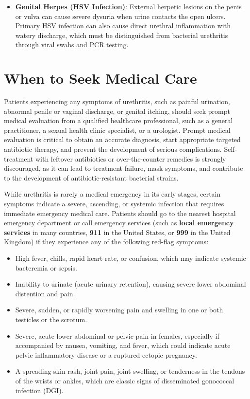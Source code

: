 \begin{itemize}
    \item \textbf{Genital Herpes (HSV Infection)}: External herpetic lesions on the penis or vulva can cause severe dysuria when urine contacts the open ulcers. Primary HSV infection can also cause direct urethral inflammation with watery discharge, which must be distinguished from bacterial urethritis through viral swabs and PCR testing.
\end{itemize}

\section*{When to Seek Medical Care}
Patients experiencing any symptoms of urethritis, such as painful urination, abnormal penile or vaginal discharge, or genital itching, should seek prompt medical evaluation from a qualified healthcare professional, such as a general practitioner, a sexual health clinic specialist, or a urologist. Prompt medical evaluation is critical to obtain an accurate diagnosis, start appropriate targeted antibiotic therapy, and prevent the development of serious complications. Self-treatment with leftover antibiotics or over-the-counter remedies is strongly discouraged, as it can lead to treatment failure, mask symptoms, and contribute to the development of antibiotic-resistant bacterial strains.

While urethritis is rarely a medical emergency in its early stages, certain symptoms indicate a severe, ascending, or systemic infection that requires immediate emergency medical care. Patients should go to the nearest hospital emergency department or call emergency services (such as \textbf{local emergency services} in many countries, \textbf{911} in the United States, or \textbf{999} in the United Kingdom) if they experience any of the following red-flag symptoms:
\begin{itemize}
    \item High fever, chills, rapid heart rate, or confusion, which may indicate systemic bacteremia or sepsis.

    \item Inability to urinate (acute urinary retention), causing severe lower abdominal distention and pain.

    \item Severe, sudden, or rapidly worsening pain and swelling in one or both testicles or the scrotum.

    \item Severe, acute lower abdominal or pelvic pain in females, especially if accompanied by nausea, vomiting, and fever, which could indicate acute pelvic inflammatory disease or a ruptured ectopic pregnancy.

    \item A spreading skin rash, joint pain, joint swelling, or tenderness in the tendons of the wrists or ankles, which are classic signs of disseminated gonococcal infection (DGI).
\end{itemize}

